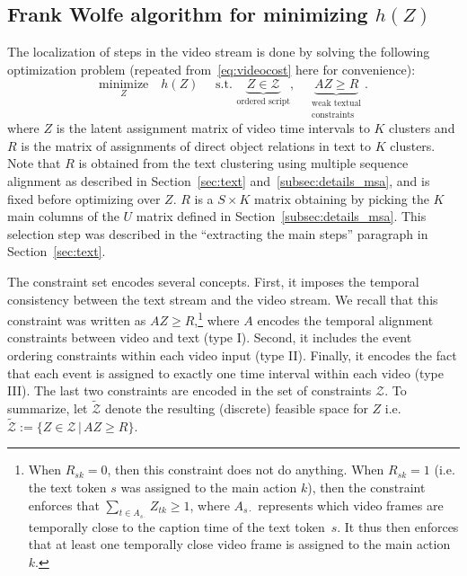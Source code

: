 \documentclass[10pt,twocolumn,letterpaper]{article}
\begin{document}
\subsection{Frank Wolfe algorithm for minimizing $h(Z)$}
\label{subsec:fw_dp}

The localization of steps in the video stream is done by solving the following optimization problem
(repeated from~\eqref{eq:videocost} here for convenience):
\begin{equation}
\underset{Z}{\text{minimize}} \quad h(Z) \quad  \text{ s.t. }  \underbrace{Z \in \mathcal{Z}}_{\text{ordered script}}, \quad
\underbrace{AZ \geq R}_{\substack{\text{weak textual}\\ \text{constraints}} }.
\label{eq:hFWproblem}
\end{equation}
where $Z$ is the latent assignment matrix of video time intervals to $K$ clusters and $R$ is the matrix of assignments of direct object relations in text to $K$ clusters.
%
Note that $R$ is obtained from the text clustering using multiple sequence alignment as described in Section~\ref{sec:text} and~\ref{subsec:details_msa}, and is fixed before optimizing over $Z$.
$R$ is a $S \times K$ matrix obtaining by picking the $K$ main columns of the $U$ matrix
defined in Section~\ref{subsec:details_msa}. This selection step
was described in the ``extracting the main steps'' paragraph in Section~\ref{sec:text}.

%
The constraint set encodes several concepts.
First, it imposes the temporal consistency between the text stream and the video stream. 
We recall that this constraint was written as $AZ \geq R$,\footnote{
When $R_{sk} = 0$, then this constraint does not do anything. When $R_{sk} = 1$ (i.e. the
text token $s$ was assigned to the main action $k$), then the constraint enforces
that $\sum_{t \in A_{s \cdot}} Z_{tk} \geq 1$, where $A_{s \cdot}$ represents
which video frames are temporally close to the caption time of the text token~$s$.
It thus then enforces that at least one temporally close video frame is assigned
to the main action $k$.
} 
where $A$ encodes the temporal alignment constraints between video and text (type I).
Second, it includes the event ordering constraints within each video input (type II).
Finally, it encodes the fact that each event is assigned to exactly one time interval within each video (type III).
The last two constraints are encoded in the set of constraints $\mathcal{Z}$.
To summarize, let $\mathcal{\tilde{Z}}$ denote the resulting (discrete) feasible space for $Z$ i.e. $\mathcal{\tilde{Z}} := \{Z \in \mathcal{Z} \, | \,AZ \geq R \}$.
%
%
\end{document}

